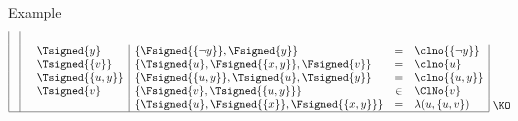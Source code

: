 \begin{frame}[shrink=0]{Example}
\[\begin{array}[b]{|c|ll|lcl|}
      \\
                 &                           &\Tsigned{y}          &\{\Fsigned{\{\neg y\}},\Fsigned{y}\}             & = &\clno{\{\neg y\}}
      \\
                 &                           &\Tsigned{\{v\}}      &\{\Tsigned{u},\Fsigned{\{x,y\}},\Fsigned\{v\}\}  & = &\clno{u}
      \\
                 &                           &\Tsigned{\{u,y\}}    &\{\Fsigned{\{u,y\}},\Tsigned{u},\Tsigned{y}\}    & = &\clno{\{u,y\}}
      \\
                 &                           &\Tsigned{v}          &\{\Fsigned{v},\Tsigned{\{u,y\}}\}                &\in&\ClNo{v}
      \\
                 &                           &                     &\{\Tsigned{u},\Fsigned{\{x\}},\Fsigned{\{x,y\}}\}& = &\lambda(u,\{u,v\})
      \\\hline
    \end{array}
    ~\raisebox{1mm}{\KO}
  \]
\end{frame}
%
